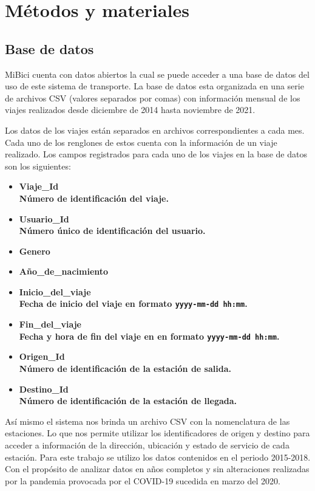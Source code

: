 \section{Métodos y materiales}

\subsection{Base de datos}

MiBici cuenta con datos abiertos la cual se puede acceder a una base de datos del uso de este sistema de transporte\cite{mibici_data}. La base de datos esta organizada en una serie de archivos CSV (valores separados por comas) con información mensual de los viajes realizados desde diciembre de 2014 hasta noviembre de 2021.

Los datos de los viajes están separados en archivos correspondientes a cada mes. Cada uno de los renglones de estos cuenta con la información de un viaje realizado. Los campos registrados para cada uno de los viajes en la base de datos son los siguientes:

\begin{itemize}
    \item \bfseries{Viaje\_Id }\normalfont \\ Número de identificación del viaje.
    \item \bfseries{Usuario\_Id }\normalfont\\ Número único de identificación del usuario.
    \item \bfseries{Genero }\normalfont
    \item \bfseries{Año\_de\_nacimiento }
    \item \bfseries{Inicio\_del\_viaje} \normalfont \\ Fecha de inicio del viaje en formato \lstinline|yyyy-mm-dd hh:mm|.
    \item \bfseries{Fin\_del\_viaje }\normalfont \\ Fecha y hora de fin del viaje en en formato \lstinline|yyyy-mm-dd hh:mm|.
    \item \bfseries{Origen\_Id }\normalfont \\ Número de identificación de la estación de salida.
    \item \bfseries{Destino\_Id }\normalfont \\ Número de identificación de la estación de llegada.
\end{itemize}

Así mismo el sistema nos brinda un archivo CSV con la nomenclatura de las estaciones. Lo que nos permite utilizar los identificadores de origen y destino para acceder a información de la dirección, ubicación y estado de servicio de cada estación. Para este trabajo se utilizo los datos contenidos en el periodo 2015-2018. Con el propósito de analizar datos en años completos y sin alteraciones realizadas por la pandemia provocada por el COVID-19 sucedida en marzo del 2020.


